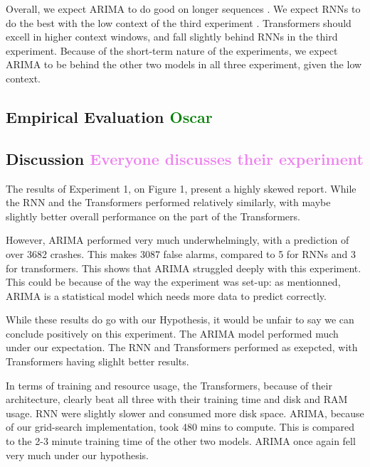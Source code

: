 \documentclass[12pt, letterpaper]{article}
\begin{document}
    
Overall, we expect ARIMA to do good on longer sequences \cite{ho2021}. We expect RNNs to do the best with the low context of the third experiment \cite{Hansika}. Transformers should excell in higher context windows, and fall slightly behind RNNs in the third experiment. Because of the short-term nature of the experiments, we expect ARIMA to be behind the other two models in all three experiment, given the low context.
\subsection*{Empirical Evaluation \textcolor{green}{Oscar}}


\subsection*{Discussion \textcolor{violet}{Everyone discusses their experiment}}

The results of Experiment 1, on Figure 1, present a highly skewed report. While the RNN and the Transformers performed relatively similarly, with maybe slightly better overall performance on the part of the Transformers.

However, ARIMA performed very much underwhelmingly, with a prediction of over 3682 crashes. This makes 3087 false alarms, compared to 5 for RNNs and 3 for transformers. This shows that ARIMA struggled deeply with this experiment. This could be because of the way the experiment was set-up: as mentionned, ARIMA is a statistical model which needs more data to predict correctly.

While these results do go with our Hypothesis, it would be unfair to say we can conclude positively on this experiment. The ARIMA model performed much under our expectation. The RNN and Transformers performed as exepcted, with Transformers having slighlt better results.

In terms of training and resource usage, the Transformers, because of their architecture, clearly beat all three with their training time and disk and RAM usage. RNN were slightly slower and consumed more disk space. ARIMA, because of our grid-search implementation, took 480 mins to compute. This is compared to the 2-3 minute training time of the other two models. ARIMA once again fell very much under our hypothesis.
\end{document}
